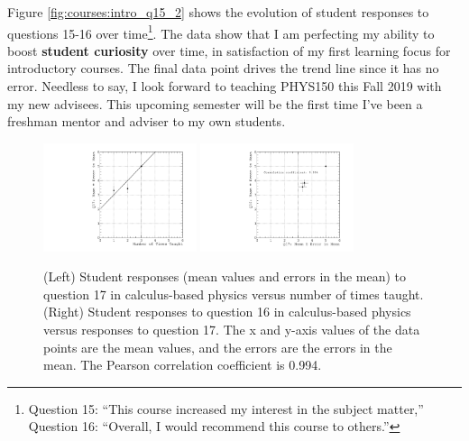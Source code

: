 \documentclass[../../main.tex]{subfiles}
\begin{document}
Figure \ref{fig:courses:intro_q15_2} shows the evolution of student responses to questions 15-16 over time\footnote{Question 15: ``This course increased my interest in the subject matter,'' Question 16: ``Overall, I would recommend this course to others.''}.  The data show that I am perfecting my ability to boost \textbf{student curiosity} over time, in satisfaction of my first learning focus for introductory courses.  The final data point drives the trend line since it has no error.  Needless to say, I look forward to teaching PHYS150 this Fall 2019 with my new advisees.  This upcoming semester will be the first time I've been a freshman mentor and adviser to my own students.

\begin{figure}
\centering
\includegraphics[width=0.4\textwidth]{Q17_calculus_based.pdf}
\includegraphics[width=0.4\textwidth]{Q16_Q17_calculus_based.pdf}
\caption{\label{fig:courses:intro_q17_2}  (Left) Student responses (mean values and errors in the mean) to question 17 in calculus-based physics versus number of times taught. (Right) Student responses to question 16 in calculus-based physics versus responses to question 17.  The x and y-axis values of the data points are the mean values, and the errors are the errors in the mean.  The Pearson correlation coefficient is 0.994.}
\end{figure}
\end{document}
